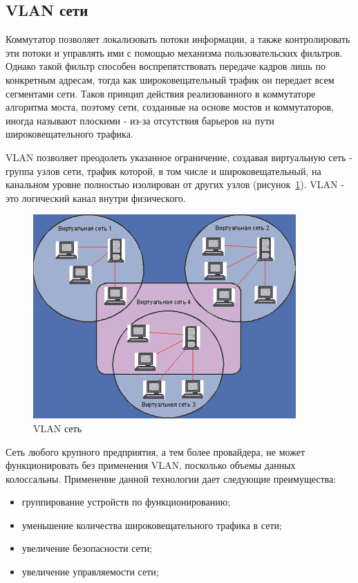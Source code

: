 \subsection{VLAN сети}
Коммутатор позволяет локализовать потоки информации, а также контролировать эти потоки и управлять ими с помощью механизма пользовательских фильтров. Однако такой фильтр способен воспрепятствовать передаче кадров лишь по конкретным адресам, тогда как широковещательный трафик он передает всем сегментами сети. Таков принцип действия реализованного в коммутаторе алгоритма моста, поэтому сети, созданные на основе мостов и коммутаторов, иногда называют плоскими - из-за отсутствия барьеров на пути широковещательного трафика.

VLAN позволяет преодолеть указанное ограничение, создавая виртуальную сеть - группа узлов сети, трафик которой, в том числе и широковещательный, на канальном уровне полностью изолирован от других узлов (рисунок~\ref{pic:vlan_net_example}). VLAN - это логический канал внутри физического.
\begin{figure}
\centering
\includegraphics[scale=0.55]{pictures/vlan_net_example}
\caption{VLAN сеть}
\label{pic:vlan_net_example}
\end{figure}

Сеть любого крупного предприятия, а тем более провайдера, не может функционировать без применения VLAN, посколько объемы данных колоссальны. Применение данной технологии дает следующие преимущества:
\begin{itemize}
\item группирование устройств по функционированию;
\item уменьшение количества широковещательного трафика в сети;
\item увеличение безопасности сети;
\item увеличение управляемости сети;
\end{itemize}

